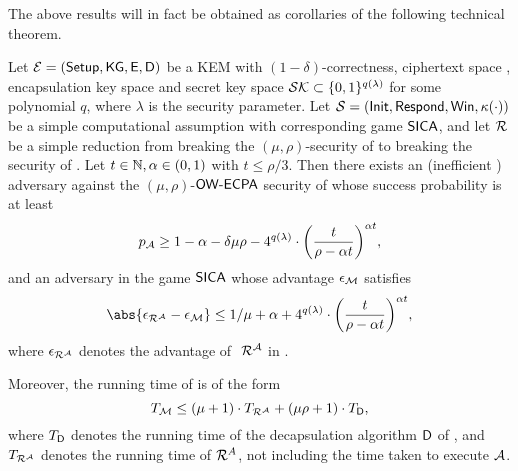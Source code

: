 The above results will in fact be obtained as corollaries
of the following technical theorem.

\begin{theorem}\label{thm:owecpa}
  Let \(\mathcal{E} = (\mathsf{Setup}, \mathsf{KG}, \mathsf{E}, \mathsf{D})\) be a KEM
  with \((1-\delta)\)-correctness,
  ciphertext space \setC, encapsulation key space \keyspace
  and secret key space \(\mathcal{SK} \subset \{0,1\}^{q(\lambda)}\) for some polynomial \(q\),
  where \(\lambda\) is the security parameter.
  Let \(\mathcal{S} = (\mathsf{Init},\allowbreak \mathsf{Respond},\allowbreak \mathsf{Win},\allowbreak \kappa(\cdot))\)
  be a simple computational assumption
  with corresponding game \(\mathsf{SICA}\),
  and let \(\redR\) be a simple reduction
  from breaking the \((\mu,\rho)\)-\OWECPA security of \KEM to breaking
  the \SICA security of \Simple.
  Let \(t \in \mathbb{N}, \alpha \in (0,1)\) with \(t \le \rho/3\).
  Then there exists an (inefficient )
  adversary \advA against the \((\mu,\rho)\)-\(\mathsf{OW}\text{-}\mathsf{ECPA}\) security of \KEM
  whose success probability is at least
  \begin{equation}\label{ineq:A}
    p_{\advA} \ge 1 - \alpha - \delta \mu \rho
    - 4^{q(\lambda)} \cdot \left( \frac{t}{\rho - \alpha t} \right)^{\alpha t},
  \end{equation}
  and an adversary \redM in the game \(\mathsf{SICA}\) whose advantage \(\epsilon_{\mathcal{M}}\) satisfies
  \begin{equation}\label{ineq:M}
    \abs{\epsilon_{\redR^{\advA}} - \epsilon_{\redM}} \le 1/\mu + \alpha
    + 4^{q(\lambda)} \cdot \left( \frac{t}{\rho - \alpha t} \right)^{\alpha t},
  \end{equation}
  where \(\epsilon_{\redR^{\advA}}\) denotes the advantage of \(\text{ }\redR^{\advA}\) in \SICA.

  Moreover, the running time of \redM is of the form
  \begin{equation}\label{ineq:M:time}
    T_{\redM} \le (\mu + 1) \cdot T_{\redR^{\advA}} + (\mu \rho + 1) \cdot T_{\Decaps},
  \end{equation}
  where \(T_{\mathsf{D}}\) denotes the running time of the decapsulation algorithm
  \(\mathsf{D}\) of \KEM, and \(T_{\redR^{\advA}}\) denotes the running time of \(\redR^{A}\),
  not including the time taken to execute \(\mathcal{A}\).
\end{theorem}

